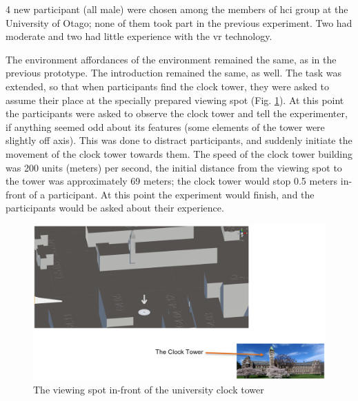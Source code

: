 4 new participant (all male) were chosen among the members of \gls{hci} group at the University of Otago; none of them took part in the previous experiment. Two had moderate and two had little experience with the \gls{vr} technology.

The environment affordances of the environment remained the same, as in the previous prototype. The introduction remained the same, as well. The task was extended, so that when participants find the clock tower, they were asked to assume their place at the specially prepared viewing spot (Fig. \ref{fig:prototype2viewvingspot}). At this point the participants were asked to observe the clock tower and tell the experimenter, if anything seemed odd about its features (some elements of the tower were slightly off axis). This was done to distract participants, and suddenly initiate the movement of the clock tower towards them. The speed of the clock tower building was 200 units (meters) per second, the initial distance from the viewing spot to the tower was approximately 69 meters; the clock tower would stop 0.5 meters in-front of a participant. At this point the experiment would finish, and the participants would be asked about their experience.

\begin{figure}
	\centering
	\includegraphics[width=\linewidth]{figures/placeholders/prototype2_viewving_spot}
	\caption{The viewing spot in-front of the university clock tower}
	\label{fig:prototype2viewvingspot}
\end{figure}

